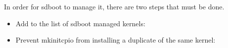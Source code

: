\documentclass[letterpaper,11pt,english]{sphinxmanual}
\begin{document}
\sphinxAtStartPar
In order for sd\sphinxhyphen{}boot to manage it, there are two steps that must be done.
\begin{itemize}
\item {} 
\sphinxAtStartPar
Add  to the list of sd\sphinxhyphen{}boot managed kernels:

\begin{sphinxVerbatim}[commandchars=\\\{\}]
   
\end{sphinxVerbatim}

\item {} 
\sphinxAtStartPar
Prevent mkinitcpio from installing a duplicate of the same kernel:

\begin{sphinxVerbatim}[commandchars=\\\{\}]
   
    
    
\end{sphinxVerbatim}

\end{itemize}

\sphinxstepscope
\end{document}
